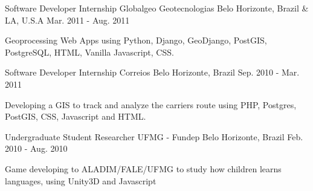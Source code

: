 \begin{cventries}
  \cventry
    {Software Developer Internship} %
    {Globalgeo Geotecnologias} %
    {Belo Horizonte, Brazil \& LA, U.S.A} %
    {Mar. 2011 - Aug. 2011} %
    {
      \begin{cvitems} %
        \item {Geoprocessing Web Apps using Python, Django, GeoDjango, PostGIS, PostgreSQL, HTML, Vanilla Javascript, CSS.}
      \end{cvitems}
    }

  \cventry
    {Software Developer Internship} %
    {Correios} %
    {Belo Horizonte, Brazil} %
    {Sep. 2010 - Mar. 2011} %
    {
      \begin{cvitems} %
        \item {Developing a GIS to track and analyze the carriers route using PHP, Postgres, PostGIS, CSS, Javascript and HTML.}
      \end{cvitems}
    }

  \cventry
    {Undergraduate Student Researcher} %
    {UFMG - Fundep} %
    {Belo Horizonte, Brazil} %
    {Feb. 2010 - Aug. 2010} %
    {
      \begin{cvitems} %
        \item {Game developing to ALADIM/FALE/UFMG to study how children learns languages, using Unity3D and Javascript}
      \end{cvitems}
    }

\end{cventries}
